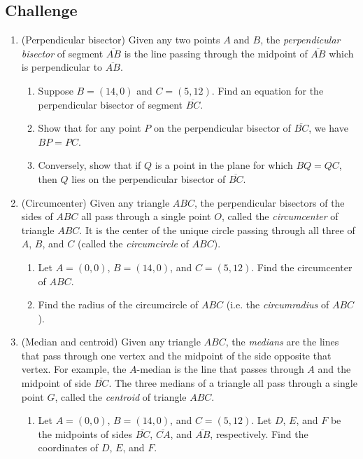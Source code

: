 \subsection{Challenge}

\begin{enumerate}[resume]
\item (Perpendicular bisector) Given any two points $A$ and $B$, the \emph{perpendicular bisector} of segment $\overline{AB}$ is the line passing through the midpoint of $\overline{AB}$ which is perpendicular to $\overline{AB}$.
\begin{enumerate}
\item Suppose $B = (14,0)$ and $C = (5,12)$. Find an equation for the perpendicular bisector of segment $\overline{BC}$.
\item Show that for any point $P$ on the perpendicular bisector of $\overline{BC}$, we have $BP = PC$.
\item Conversely, show that if $Q$ is a point in the plane for which $BQ = QC$, then $Q$ lies on the perpendicular bisector of $\overline{BC}$.
\end{enumerate}
\item (Circumcenter) Given any triangle $ABC$, the perpendicular bisectors of the sides of $ABC$ all pass through a single point $O$, called the \emph{circumcenter} of triangle $ABC$. It is the center of the unique circle passing through all three of $A$, $B$, and $C$ (called the \emph{circumcircle} of $ABC$).
\begin{enumerate}
\item Let $A = (0,0)$, $B = (14,0)$, and $C = (5,12)$. Find the circumcenter of $ABC$.
\item Find the radius of the circumcircle of $ABC$ (i.e. the \emph{circumradius} of $ABC$).
\end{enumerate}
\item (Median and centroid) Given any triangle $ABC$, the \emph{medians} are the lines that pass through one vertex and the midpoint of the side opposite that vertex. For example, the $A$-median is the line that passes through $A$ and the midpoint of side $\overline{BC}$. The three medians of a triangle all pass through a single point $G$, called the \emph{centroid} of triangle $ABC$.
\begin{enumerate}
\item Let $A = (0,0)$, $B = (14,0)$, and $C = (5,12)$. Let $D$, $E$, and $F$ be the midpoints of sides $\overline{BC}$, $\overline{CA}$, and $\overline{AB}$, respectively. Find the coordinates of $D$, $E$, and $F$.

\end{enumerate}
\end{enumerate}
